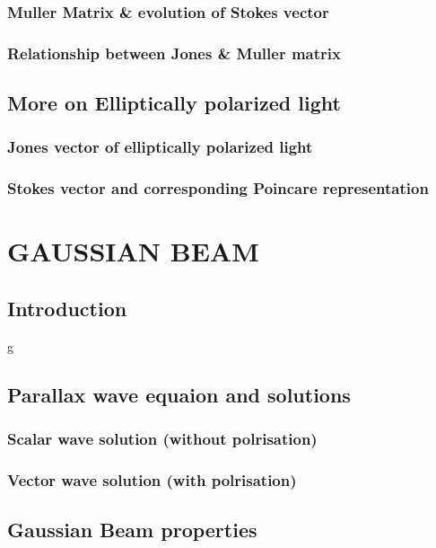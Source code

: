 \documentclass[11pt,a4paper]{article}
\numberwithin{equation}{section}
\begin{document}
\subsubsection{Muller Matrix \& evolution of Stokes vector}

\subsubsection{Relationship between Jones \& Muller matrix}

\subsection{More on Elliptically polarized light}
\subsubsection{Jones vector of elliptically polarized light}

\subsubsection{Stokes vector and corresponding Poincare representation}



\clearpage
\section{GAUSSIAN BEAM}
\subsection{Introduction}
g
\subsection{Parallax wave equaion and solutions}
\subsubsection{Scalar wave solution (without polrisation)}

\subsubsection{Vector wave solution (with polrisation)}

\subsection{Gaussian Beam properties}
\end{document}
